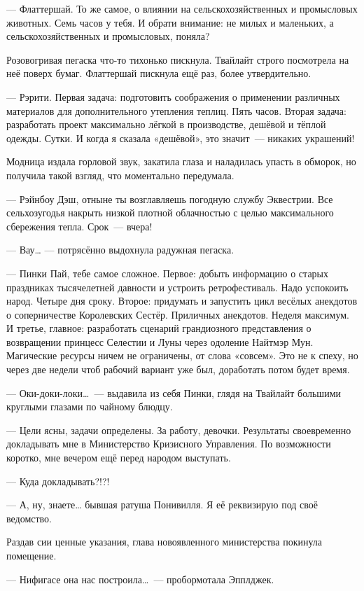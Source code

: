 \documentclass[twoside,a5paper,12pt]{extbook}
\begin{document}
— Флаттершай. То же самое, о влиянии на сельскохозяйственных и промысловых животных. Семь часов у тебя. И обрати внимание: не милых и маленьких, а сельскохозяйственных и промысловых, поняла?

Розовогривая пегаска что-то тихонько пискнула. Твайлайт строго посмотрела на неё поверх бумаг. Флаттершай пискнула ещё раз, более утвердительно.

— Рэрити. Первая задача: подготовить соображения о применении различных материалов для дополнительного утепления теплиц. Пять часов. Вторая задача: разработать проект максимально лёгкой в производстве, дешёвой и тёплой одежды. Сутки. И когда я сказала «дешёвой», это значит — никаких украшений!

Модница издала горловой звук, закатила глаза и наладилась упасть в обморок, но получила такой взгляд, что моментально передумала.

— Рэйнбоу Дэш, отныне ты возглавляешь погодную службу Эквестрии. Все сельхозугодья накрыть низкой плотной облачностью с целью максимального сбережения тепла. Срок — вчера!

— Вау… — потрясённо выдохнула радужная пегаска.

— Пинки Пай, тебе самое сложное. Первое: добыть информацию о старых праздниках тысячелетней давности и устроить ретрофестиваль. Надо успокоить народ. Четыре дня сроку. Второе: придумать и запустить цикл весёлых анекдотов о соперничестве Королевских Сестёр. Приличных анекдотов. Неделя максимум. И третье, главное: разработать сценарий грандиозного представления о возвращении принцесс Селестии и Луны через одоление Найтмэр Мун. Магические ресурсы ничем не ограничены, от слова «совсем». Это не к спеху, но через две недели чтоб рабочий вариант уже был, доработать потом будет время.

— Оки-доки-локи… — выдавила из себя Пинки, глядя на Твайлайт большими круглыми глазами по чайному блюдцу.

— Цели ясны, задачи определены. За работу, девочки. Результаты своевременно докладывать мне в Министерство Кризисного Управления.  По возможности коротко, мне вечером ещё перед народом выступать.

— Куда докладывать?!?!

— А, ну, знаете… бывшая ратуша Понивилля. Я её реквизирую под своё ведомство.

Раздав сии ценные указания, глава новоявленного министерства покинула помещение.

— Нифигасе она нас построила… — пробормотала Эпплджек.
\end{document}
